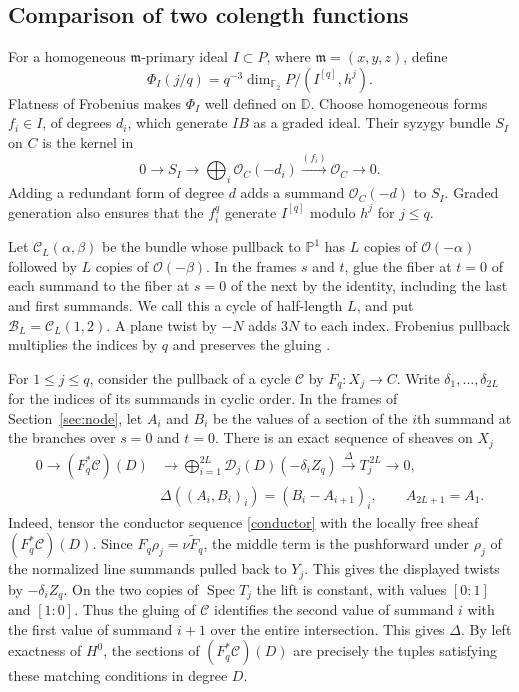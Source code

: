 \documentclass[11pt,a4paper,reqno]{amsart}
\numberwithin{equation}{section}
\theoremstyle{plain}
\newcommand{\OO}{\mathcal O}
\newcommand{\PP}{\mathbb P}
\newcommand{\Dcal}{\mathcal D}
\newcommand{\Bcal}{\mathcal B}
\newcommand{\Ccal}{\mathcal C}
\newcommand{\m}{\mathfrak m}
\begin{document}
\subsection{Comparison of two colength functions}\label{sec:compare}

For a homogeneous $\m$-primary ideal $I\subset P$, where $\m=(x,y,z)$, define
\[
 \Phi_I(j/q)=q^{-3}\dim_{\mathbb F_2}P/(I^{[q]},h^j).
\]
Flatness of Frobenius makes $\Phi_I$ well defined on $\mathbb D$. Choose homogeneous forms $f_i\in I$, of degrees $d_i$, which generate $IB$ as a graded ideal. Their syzygy bundle $S_I$ on $C$ is the kernel in
\begin{equation}\label{rowseq}
 0\longrightarrow S_I\longrightarrow\bigoplus_i\OO_C(-d_i)
     \xrightarrow{(f_i)}\OO_C\longrightarrow0 .
\end{equation}
Adding a redundant form of degree $d$ adds a summand $\OO_C(-d)$ to $S_I$. Graded generation also ensures that the $f_i^q$ generate $I^{[q]}$ modulo $h^j$ for $j\le q$.

Let $\Ccal_L(\alpha,\beta)$ be the bundle whose pullback to $\PP^1$ has $L$ copies of $\OO(-\alpha)$ followed by $L$ copies of $\OO(-\beta)$. In the frames $s$ and $t$, glue the fiber at $t=0$ of each summand to the fiber at $s=0$ of the next by the identity, including the last and first summands. We call this a cycle of half-length $L$, and put $\Bcal_L=\Ccal_L(1,2)$. A plane twist by $-N$ adds $3N$ to each index. Frobenius pullback multiplies the indices by $q$ and preserves the gluing \cite{Burban}.

For $1\le j\le q$, consider the pullback of a cycle $\Ccal$ by $F_q:X_j\to C$. Write $\delta_1,\ldots,\delta_{2L}$ for the indices of its summands in cyclic order. In the frames of Section~\ref{sec:node}, let $A_i$ and $B_i$ be the values of a section of the $i$th summand at the branches over $s=0$ and $t=0$. There is an exact sequence of sheaves on $X_j$
\begin{equation}\label{eq:matching}
\begin{split}
0\longrightarrow (F_q^*\Ccal)(D)
 &\longrightarrow \bigoplus_{i=1}^{2L}\Dcal_j(D)(-\delta_i Z_q)
 \xrightarrow{\ \Delta\ } T_j^{\,2L}\longrightarrow0,\\[-1pt]
 &\Delta((A_i,B_i)_i)=(B_i-A_{i+1})_i,\qquad A_{2L+1}=A_1 .
\end{split}
\end{equation}
Indeed, tensor the conductor sequence \eqref{conductor} with the locally free sheaf $(F_q^*\Ccal)(D)$.
Since $F_q\rho_j=\nu\widetilde F_q$, the middle term is the pushforward under $\rho_j$ of the normalized line summands pulled back to $Y_j$. This gives the displayed twists by $-\delta_i Z_q$. On the two copies of $\operatorname{Spec}T_j$ the lift is constant, with values $[0:1]$ and $[1:0]$. Thus the gluing of $\Ccal$ identifies the second value of summand $i$ with the first value of summand $i+1$ over the entire intersection. This gives $\Delta$. By left exactness of $H^0$, the sections of $(F_q^*\Ccal)(D)$ are precisely the tuples satisfying these matching conditions in degree $D$.
\end{document}
